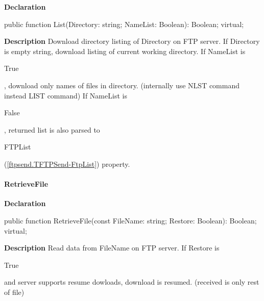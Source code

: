 \documentclass{report}
\newif\ifpdf
\begin{document}
\label{ftpsend.TFTPSend-List}
\begin{list}{}{
\setlength{\itemindent}{0cm}
\setlength{\listparindent}{0cm}
\setlength{\leftmargin}{\evensidemargin}
\addtolength{\leftmargin}{\tmplength}
\settowidth{\labelsep}{X}
\addtolength{\leftmargin}{\labelsep}
\setlength{\labelwidth}{\tmplength}
}
\item[\textbf{Declaration}\hfill]
\ifpdf
\begin{flushleft}
\fi
\begin{ttfamily}
public function List(Directory: string; NameList: Boolean): Boolean; virtual;\end{ttfamily}

\ifpdf
\end{flushleft}
\fi

\par
\item[\textbf{Description}]
Download directory listing of Directory on FTP server. If Directory is empty string, download listing of current working directory. If NameList is \begin{ttfamily}True\end{ttfamily}, download only names of files in directory. (internally use NLST command instead LIST command) If NameList is \begin{ttfamily}False\end{ttfamily}, returned list is also parsed to \begin{ttfamily}FTPList\end{ttfamily}(\ref{ftpsend.TFTPSend-FtpList}) property.

\end{list}
\paragraph*{RetrieveFile}\hspace*{\fill}

\label{ftpsend.TFTPSend-RetrieveFile}
\begin{list}{}{
\setlength{\itemindent}{0cm}
\setlength{\listparindent}{0cm}
\setlength{\leftmargin}{\evensidemargin}
\addtolength{\leftmargin}{\tmplength}
\settowidth{\labelsep}{X}
\addtolength{\leftmargin}{\labelsep}
\setlength{\labelwidth}{\tmplength}
}
\item[\textbf{Declaration}\hfill]
\ifpdf
\begin{flushleft}
\fi
\begin{ttfamily}
public function RetrieveFile(const FileName: string; Restore: Boolean): Boolean; virtual;\end{ttfamily}

\ifpdf
\end{flushleft}
\fi

\par
\item[\textbf{Description}]
Read data from FileName on FTP server. If Restore is \begin{ttfamily}True\end{ttfamily} and server supports resume dowloads, download is resumed. (received is only rest of file)

\end{list}
\end{document}
